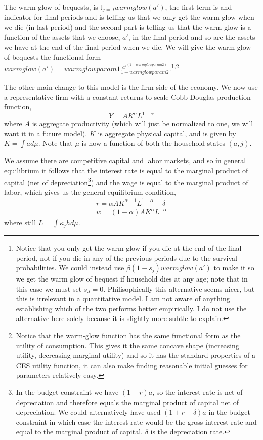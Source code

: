 The warm glow of bequests, is $\mathbb{I}_{j=J} warmglow(a')$, the first term is and indicator for final periods and is telling us that we only get the warm glow when we die (in last period) and the second part is telling us that the warm glow is a function of the assets that we choose, $a'$, in the final period and so are the assets we have at the end of the final period when we die. We will give the warm glow of bequests the functional form $warmglow(a')=warmglowparam1 \frac{a'^{(1-warmglowparam2)}}{1-warmglowparam2}$.\footnote{Notice that you only get the warm-glow if you die at the end of the final period, not if you die in any of the previous periods due to the survival probabilities. We could instead use $\beta (1-s_j)warmglow(a')$ to make it so we get the warm glow of bequest if household dies at any age; note that in this case we must set $s_J=0$. Philisophically this alternative seems nicer, but this is irrelevant in a quantitative model. I am not aware of anything establishing which of the two performs better empirically. I do not use the alternative here solely because it is slightly more subtle to explain.}\textsuperscript{,}\footnote{Notice that the warm-glow function has the same functional form as the utility of consumption. This gives it the same concave shape (increasing utility, decreasing marginal utility) and so it has the standard properties of a CES utility function, it can also make finding reasonable initial guesses for parameters relatively easy.}

The other main change to this model is the firm side of the economy. We now use a representative firm with a constant-returns-to-scale Cobb-Douglas production function,
\begin{equation}
 Y= A K^{\alpha} L^{1-\alpha}
\end{equation}
where $A$ is aggregate productivity (which will just be normalized to one, we will want it in a future model). $K$ is aggregate physical capital, and is given by $K=\int a d\mu$. Note that $\mu$ is now a function of both the household states $(a,j)$.

We assume there are competitive capital and labor markets, and so in general equilibrium it follows that the interest rate is equal to the marginal product of capital (net of depreciation\footnote{In the budget constraint we have $(1+r)a$, so the interest rate is net of depreciation and therefore equals the marginal product of capital net of depreciation. We could alternatively have used $(1+r-\delta)a$ in the budget constraint in which case the interest rate would be the gross interest rate and equal to the marginal product of capital. $\delta$ is the depreciation rate.}) and the wage is equal to the marginal product of labor, which gives us the general equilibrium condition,
\begin{eqnarray*}
 r=\alpha A K^{\alpha-1} L^{1-\alpha}-\delta \\
 w=(1-\alpha)A K^{\alpha} L^{-\alpha}
\end{eqnarray*}
where still $L= \int \kappa_j h d\mu$.

